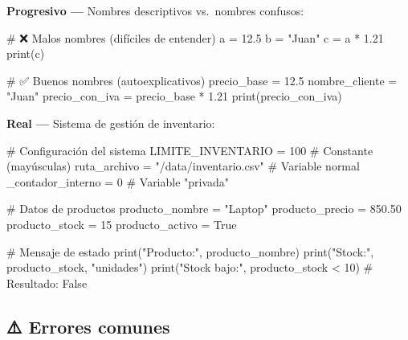 \documentclass[
  doc,
  floatsintext,
  longtable,
  a4paper,
  nolmodern,
  notxfonts,
  notimes,
  12pt,
  colorlinks=true,linkcolor=blue,citecolor=blue,urlcolor=blue]{apa7}
\newenvironment{Shaded}{\begin{snugshade}}{\end{snugshade}}
\newcommand{\BuiltInTok}[1]{\textcolor[rgb]{0.00,0.23,0.31}{#1}}
\newcommand{\CommentTok}[1]{\textcolor[rgb]{0.37,0.37,0.37}{#1}}
\newcommand{\DecValTok}[1]{\textcolor[rgb]{0.68,0.00,0.00}{#1}}
\newcommand{\FloatTok}[1]{\textcolor[rgb]{0.68,0.00,0.00}{#1}}
\newcommand{\NormalTok}[1]{\textcolor[rgb]{0.00,0.23,0.31}{#1}}
\newcommand{\OperatorTok}[1]{\textcolor[rgb]{0.37,0.37,0.37}{#1}}
\newcommand{\StringTok}[1]{\textcolor[rgb]{0.13,0.47,0.30}{#1}}
\newcommand{\VariableTok}[1]{\textcolor[rgb]{0.07,0.07,0.07}{#1}}
\begin{document}
\textbf{Progresivo ---} Nombres descriptivos vs.~nombres confusos:

\begin{Shaded}
\begin{Highlighting}[]
\CommentTok{\# ❌ Malos nombres (difíciles de entender)}
\NormalTok{a }\OperatorTok{=} \FloatTok{12.5}
\NormalTok{b }\OperatorTok{=} \StringTok{"Juan"}
\NormalTok{c }\OperatorTok{=}\NormalTok{ a }\OperatorTok{*} \FloatTok{1.21}
\BuiltInTok{print}\NormalTok{(c)}

\CommentTok{\# ✅ Buenos nombres (autoexplicativos)}
\NormalTok{precio\_base }\OperatorTok{=} \FloatTok{12.5}
\NormalTok{nombre\_cliente }\OperatorTok{=} \StringTok{"Juan"}
\NormalTok{precio\_con\_iva }\OperatorTok{=}\NormalTok{ precio\_base }\OperatorTok{*} \FloatTok{1.21}
\BuiltInTok{print}\NormalTok{(precio\_con\_iva)}
\end{Highlighting}
\end{Shaded}

\textbf{Real ---} Sistema de gestión de inventario:

\begin{Shaded}
\begin{Highlighting}[]
\CommentTok{\# Configuración del sistema}
\NormalTok{LIMITE\_INVENTARIO }\OperatorTok{=} \DecValTok{100}          \CommentTok{\# Constante (mayúsculas)}
\NormalTok{ruta\_archivo }\OperatorTok{=} \StringTok{"/data/inventario.csv"}  \CommentTok{\# Variable normal}
\NormalTok{\_contador\_interno }\OperatorTok{=} \DecValTok{0}            \CommentTok{\# Variable "privada"}

\CommentTok{\# Datos de productos}
\NormalTok{producto\_nombre }\OperatorTok{=} \StringTok{"Laptop"}
\NormalTok{producto\_precio }\OperatorTok{=} \FloatTok{850.50}
\NormalTok{producto\_stock }\OperatorTok{=} \DecValTok{15}
\NormalTok{producto\_activo }\OperatorTok{=} \VariableTok{True}

\CommentTok{\# Mensaje de estado}
\BuiltInTok{print}\NormalTok{(}\StringTok{"Producto:"}\NormalTok{, producto\_nombre)}
\BuiltInTok{print}\NormalTok{(}\StringTok{"Stock:"}\NormalTok{, producto\_stock, }\StringTok{"unidades"}\NormalTok{)}
\BuiltInTok{print}\NormalTok{(}\StringTok{"Stock bajo:"}\NormalTok{, producto\_stock }\OperatorTok{\textless{}} \DecValTok{10}\NormalTok{)  }\CommentTok{\# Resultado: False}
\end{Highlighting}
\end{Shaded}

\subsection{⚠️ Errores comunes}\label{errores-comunes}
\end{document}
